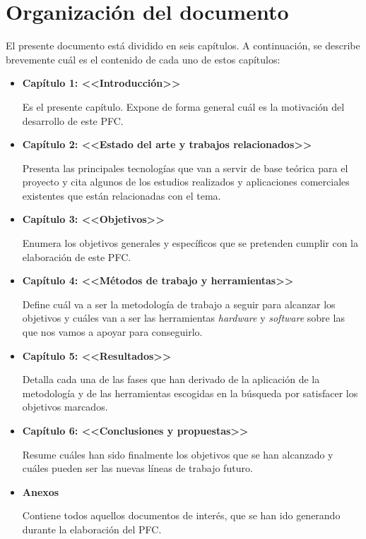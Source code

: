\section{Organización del documento}
El presente documento está dividido en seis capítulos. A continuación, se
describe brevemente cuál es el contenido de cada uno de estos capítulos:
\begin{itemize}
\item \textbf{Capítulo 1: <<Introducción>>}

Es el presente capítulo. Expone de forma general cuál es la motivación del
desarrollo de este \acs{PFC}.

\item \textbf{Capítulo 2: <<Estado del arte y trabajos relacionados>>}

Presenta las principales tecnologías que van a servir de base teórica para el 
proyecto y cita algunos de los estudios realizados y aplicaciones 
comerciales existentes que están relacionadas con el tema.

\item \textbf{Capítulo 3: <<Objetivos>>}

Enumera los objetivos generales y específicos que se pretenden cumplir con la  
elaboración de este \acs{PFC}.

\item \textbf{Capítulo 4: <<Métodos de trabajo y herramientas>>}

Define cuál va a ser la metodología de trabajo a seguir para
alcanzar los objetivos y cuáles van a ser las herramientas \emph{hardware} y
\emph{software} sobre las que nos vamos a apoyar para conseguirlo.

\item \textbf{Capítulo 5: <<Resultados>>}

Detalla cada una de las fases que han derivado de la aplicación de la
metodología y de las herramientas escogidas en la búsqueda por satisfacer
los objetivos marcados.

\item \textbf{Capítulo 6: <<Conclusiones y propuestas>>}

Resume cuáles han sido finalmente los objetivos que se han alcanzado y cuáles
pueden ser las nuevas líneas de trabajo futuro.

\item \textbf{Anexos}

Contiene todos aquellos documentos de interés, que se han ido generando durante 
la elaboración del \acs{PFC}.

\end{itemize}

